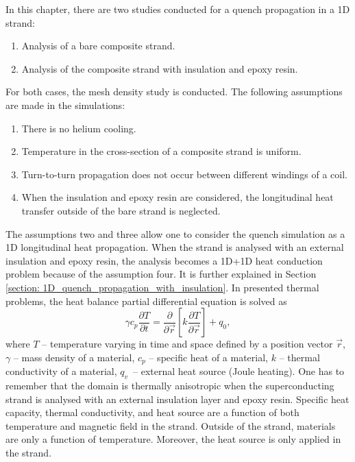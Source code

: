 
In this chapter, there are two studies conducted for a quench propagation in a 1D strand: 

\begin{enumerate}
    \item Analysis of a bare composite strand.
    \item Analysis of the composite strand with insulation and epoxy resin.
\end{enumerate}

For both cases, the mesh density study is conducted. The following assumptions are made in the simulations: 

\begin{enumerate}
    \item There is no helium cooling.
    \item Temperature in the cross-section of a composite strand is uniform.
    \item Turn-to-turn propagation does not occur between different windings of a coil.
    \item When the insulation and epoxy resin are considered, the longitudinal heat transfer outside of the bare strand is neglected.
\end{enumerate}

The assumptions two and three allow one to consider the quench simulation as a 1D longitudinal heat propagation. When the strand is analysed with an external insulation and epoxy resin, the analysis becomes a 1D+1D heat conduction problem because of the assumption four. It is further explained in Section \ref{section: 1D_quench_propagation_with_insulation}. In presented thermal problems, the heat balance partial differential equation is solved as
\begin{equation}
    \gamma c_p \frac{\partial T}{\partial t} = \frac{\partial}{\partial \vec{r}}[k \frac{\partial T}{\partial \vec{r}}] + q_0,
\end{equation}
where $T$ -- temperature varying in time and space defined by a position vector $\vec{r}$, $\gamma$ -- mass density of a material, $c_p$ -- specific heat of a material, $k$ -- thermal conductivity of a material, $q_v$~-- external heat source (Joule heating). One has to remember that the domain is thermally anisotropic when the superconducting strand is analysed with an external insulation layer and epoxy resin. Specific heat capacity, thermal conductivity, and heat source are a function of both temperature and magnetic field in the strand. Outside of the strand, materials are only a function of temperature. Moreover, the heat source is only applied in the strand.
